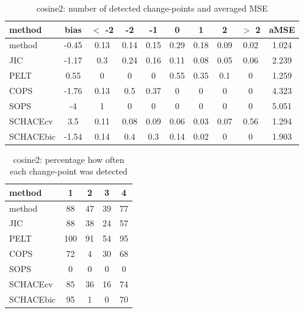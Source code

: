 \begin{table}[ht]
\centering
\begin{tabular}{l|c|ccccccc|c}
  \hline
method & bias & $<$ -2 & -2 & -1 & 0 & 1 & 2 & $>$ 2 & aMSE \\ 
  \hline
method & -0.45 &  0.13 &  0.14 &  0.15 &  0.29 &  0.18 &  0.09 &  0.02 & 1.024 \\ 
  JIC & -1.17 &   0.3 &  0.24 &  0.16 &  0.11 &  0.08 &  0.05 &  0.06 & 2.239 \\ 
  PELT &  0.55 &     0 &     0 &     0 &  0.55 &  0.35 &   0.1 &     0 & 1.259 \\ 
  COPS & -1.76 &  0.13 &   0.5 &  0.37 &     0 &     0 &     0 &     0 & 4.323 \\ 
  SOPS &    -4 &     1 &     0 &     0 &     0 &     0 &     0 &     0 & 5.051 \\ 
  SCHACEcv &   3.5 &  0.11 &  0.08 &  0.09 &  0.06 &  0.03 &  0.07 &  0.56 & 1.294 \\ 
  SCHACEbic & -1.54 &  0.14 &   0.4 &   0.3 &  0.14 &  0.02 &     0 &     0 & 1.903 \\ 
   \hline
\end{tabular}
\caption{cosine2: number of detected change-points and averaged MSE} 
\label{tab:cosine2Njumps}
\end{table}
\begin{table}[ht]
\centering
\begin{tabular}{l|cccc}
  \hline
method & 1 & 2 & 3 & 4 \\ 
  \hline
method &     88 &     47 &     39 &     77 \\ 
  JIC &     88 &     38 &     24 &     57 \\ 
  PELT &    100 &     91 &     54 &     95 \\ 
  COPS &     72 &      4 &     30 &     68 \\ 
  SOPS &      0 &      0 &      0 &      0 \\ 
  SCHACEcv &     85 &     36 &     16 &     74 \\ 
  SCHACEbic &     95 &      1 &      0 &     70 \\ 
   \hline
\end{tabular}
\caption{cosine2: percentage how often each change-point was detected} 
\label{tab:cosine2Detections}
\end{table}
